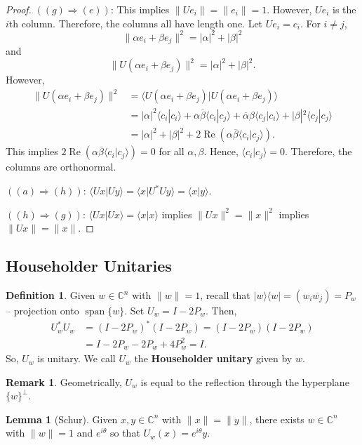 \documentclass[12pt]{article}
\theoremstyle{definition}
\newtheorem*{lemma}{Lemma}
\newtheorem*{definition}{Definition}
\newtheorem*{remark}{Remark}
\newcommand{\braket}[2]{\langle #1|#2\rangle}
\newcommand{\ketbra}[2]{|#1\rangle\langle #2|}
\newcommand{\norm}[1]{\|#1\|}
\newcommand{\C}{\mathbb{C}}
\begin{document}
\begin{proof}
$((g) \Rightarrow (e))$: This implies $\norm{Ue_i} = \norm{e_i} = 1$. However, $Ue_i$ is the $i$th column. Therefore, the columns all have length one. Let $Ue_i = c_i$. For $i \neq j$,
\[
\norm{\alpha e_i + \beta e_j}^2 = |\alpha|^2 + |\beta|^2
\]
and
\[
\norm{U(\alpha e_i + \beta e_j)}^2 = |\alpha|^2 + |\beta|^2.
\]
However,
\begin{align*}
\norm{U(\alpha e_i + \beta e_j)}^2 &= \braket{U(\alpha e_i + \beta e_j)}{U(\alpha e_i + \beta e_j)} \\
&= |\alpha|^2\braket{c_i}{c_i} + \alpha\overline{\beta}\braket{c_i}{c_j} + \overline{\alpha}\beta\braket{c_j}{c_i} + |\beta|^2\braket{c_j}{c_j} \\
&= |\alpha|^2 + |\beta|^2 + 2\operatorname{Re}(\alpha\overline{\beta}\braket{c_i}{c_j}).
\end{align*}
This implies $2\operatorname{Re}(\alpha\overline{\beta}\braket{c_i}{c_j}) = 0$ for all $\alpha,\beta$. Hence, $\braket{c_i}{c_j} = 0$. Therefore, the columns are orthonormal.

$((a) \Rightarrow (h))$: $\braket{Ux}{Uy} = \braket{x}{U^*Uy} = \braket{x}{y}$.

$((h) \Rightarrow (g))$: $\braket{Ux}{Ux} = \braket{x}{x}$ implies $\norm{Ux}^2 = \norm{x}^2$ implies $\norm{Ux} = \norm{x}$.
\end{proof}

\subsection{Householder Unitaries}

\begin{definition}
Given $w \in \C^n$ with $\norm{w} = 1$, recall that $\ketbra{w}{w} = (w_i\overline{w_j}) = P_w$ -- projection onto $\operatorname{span}\{w\}$. Set $U_w = I - 2P_w$. Then,
\begin{align*}
U_w^* U_w &= (I-2P_w)^*(I-2P_w) = (I-2P_w)(I-2P_w) \\
&= I - 2P_w - 2P_w + 4P_w^2 = I.
\end{align*}
So, $U_w$ is unitary. We call $U_w$ the \textbf{Householder unitary} given by $w$.
\end{definition}

\begin{remark}
Geometrically, $U_w$ is equal to the reflection through the hyperplane $\{w\}^\perp$.
\end{remark}

\begin{lemma}[Schur]
Given $x, y \in \C^n$ with $\norm{x} = \norm{y}$, there exists $w \in \C^n$ with $\norm{w} = 1$ and $e^{i\theta}$ so that $U_w(x) = e^{i\theta} y$.
\end{lemma}
\end{document}
